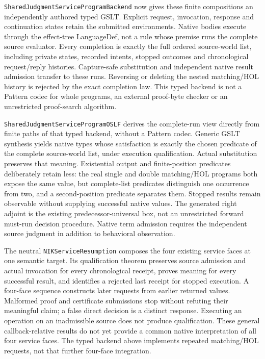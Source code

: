 \documentclass[11pt]{article}
\theoremstyle{definition}
\theoremstyle{remark}
\begin{document}
\nolinkurl{SharedJudgmentServiceProgramBackend} now gives these finite
compositions an independently authored typed GSLT. Explicit request, invocation,
response and continuation states retain the submitted environments. Native
bodies execute through the effect-tree LanguageDef, not a rule whose premise
runs the complete source evaluator. Every completion is exactly the full
ordered source-world list, including private states, recorded intents,
stopped outcomes and chronological request/reply histories. Capture-safe
substitution and independent native result admission transfer to these runs.
Reversing or deleting the nested matching/HOL history is rejected by the exact
completion law. This typed backend is not a Pattern codec for whole programs,
an external proof-byte checker or an unrestricted proof-search algorithm.

\nolinkurl{SharedJudgmentServiceProgramOSLF} derives the complete-run view
directly from finite paths of that typed backend, without a Pattern codec.
Generic GSLT synthesis yields native types whose satisfaction is exactly
the chosen predicate of the complete source-world list, under execution
qualification. Actual substitution preserves that meaning. Existential
output and finite-position predicates deliberately retain less: the real
single and double matching/HOL programs both expose the same value, but
complete-list predicates distinguish one occurrence from two, and a
second-position predicate separates them. Stopped results remain observable
without supplying successful native values. The generated right adjoint is
the existing predecessor-universal box, not an unrestricted forward must-run
decision procedure. Native term admission requires the independent source
judgment in addition to behavioral observation.

The neutral \texttt{NIKServiceResumption} composes the four existing service
faces at one semantic target. Its qualification theorem preserves source
admission and actual invocation for every chronological receipt, proves
meaning for every successful result, and identifies a rejected last receipt
for stopped execution. A four-face sequence constructs later requests from
earlier returned values. Malformed proof and certificate submissions stop
without refuting their meaningful claim; a false direct decision is a
distinct response. Executing an operation on an inadmissible source does not
produce qualification. These general callback-relative results do not yet
provide a common native interpretation of all four service faces. The typed
backend above implements repeated matching/HOL requests, not that further
four-face integration.
\end{document}
